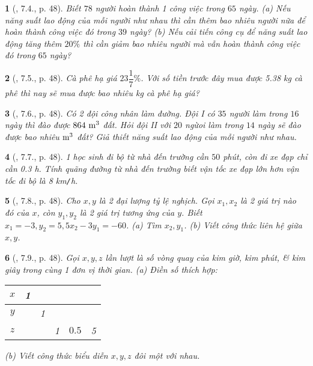 \documentclass{article}
\newtheorem{baitoan}{}
\begin{document}
\begin{baitoan}[\cite{Binh_boi_duong_Toan_7_tap_1}, 7.4., p. 48]
	Biết $78$ người hoàn thành 1 công việc trong $65$ ngày. (a) Nếu năng suất lao động của mỗi người như nhau thì cần thêm bao nhiêu người nữa để hoàn thành công việc đó trong $39$ ngày? (b) Nếu cải tiến công cụ để năng suất lao động tăng thêm $20\%$ thì cần giảm bao nhiêu người mà vẫn hoàn thành công việc đó trong $65$ ngày?
\end{baitoan}

\begin{baitoan}[\cite{Binh_boi_duong_Toan_7_tap_1}, 7.5., p. 48]
	Cà phê hạ giá $23\dfrac{1}{7}\%$. Với số tiền trước đây mua được {\rm5.38 kg} cà phê thì nay sẽ mua được bao nhiêu {\rm kg} cà phê hạ giá?
\end{baitoan}

\begin{baitoan}[\cite{Binh_boi_duong_Toan_7_tap_1}, 7.6., p. 48]
	Có 2 đội công nhân làm đường. Đội I có $35$ người làm trong $16$ ngày thì đào được $\rm864\ m^3$ đất. Hỏi đội II với $20$ ngừoi làm trong $14$ ngày sẽ đào được bao nhiêu $\rm m^3$ đất? Giả thiết năng suất lao động của mỗi người như nhau.
\end{baitoan}

\begin{baitoan}[\cite{Binh_boi_duong_Toan_7_tap_1}, 7.7., p. 48]
	1 học sinh đi bộ từ nhà đến trường cần $50$ phút, còn đi xe đạp chỉ cần {\rm0.3 h}. Tính quãng đường từ nhà đến trường biết vận tốc xe đạp lớn hơn vận tốc đi bộ là {\rm8 km{\tt/}h}.
\end{baitoan}

\begin{baitoan}[\cite{Binh_boi_duong_Toan_7_tap_1}, 7.8., p. 48]
	Cho $x,y$ là 2 đại lượng tỷ lệ nghịch. Gọi $x_1,x_2$ là 2 giá trị nào đó của $x$, còn $y_1,y_2$ là 2 giá trị tương ứng của $y$. Biết $x_1 = -3,y_2 = 5,5x_2 - 3y_1 = -60$. (a) Tìm $x_2,y_1$. (b) Viết công thức liên hệ giữa $x,y$.
\end{baitoan}

\begin{baitoan}[\cite{Binh_boi_duong_Toan_7_tap_1}, 7.9., p. 48]
	Gọi $x,y,z$ lần lượt là số vòng quay của kim giờ, kim phút, \& kim giây trong cùng 1 đơn vị thời gian. (a) Điền số thích hợp:
	\begin{table}[H]
		\centering
		\begin{tabular}{|c|c|c|c|c|c|}
			\hline
			$x$ & 1 &  &  &  &  \\
			\hline
			$y$ &  & 1 &  &  &  \\
			\hline
			$z$ &  &  & 1 & $0.5$ & 5 \\
			\hline
		\end{tabular}
	\end{table}
	\noindent(b) Viết công thức biểu diễn $x,y,z$ đôi một với nhau.
\end{baitoan}
\end{document}
